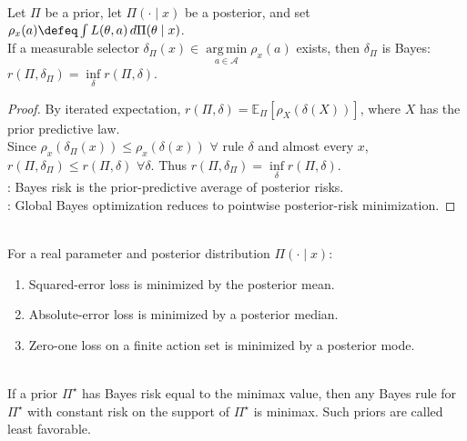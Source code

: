 \begin{proposition} \label{prop:posterior-risk-bayes-rule} \\
Let $\Pi$ be a prior, let $\Pi(\cdot\mid x)$ be a posterior, and set $\rho_x(a)\defeq\int L(\theta,a)\,d\Pi(\theta\mid x)$.\\
If a measurable selector $\delta_\Pi(x)\in\operatorname*{arg\,min}\limits_{a\in\mathcal{A}}\rho_x(a)$ exists, then $\delta_\Pi$ is Bayes: $r(\Pi,\delta_\Pi)=\inf\limits_\delta r(\Pi,\delta)$.
\begin{proof} By iterated expectation, $r(\Pi,\delta)=\mathbb{E}_{\Pi}[\rho_X(\delta(X))]$, where $X$ has the prior predictive law.\\
Since $\rho_x(\delta_\Pi(x))\leq\rho_x(\delta(x))$ $\forall$ rule $\delta$ and almost every $x$, $r(\Pi,\delta_\Pi)\leq r(\Pi,\delta)$ $\forall \delta$.
Thus $r(\Pi,\delta_\Pi)=\inf\limits_\delta r(\Pi,\delta)$.\\
: Bayes risk is the prior-predictive average of posterior risks.\\
: Global Bayes optimization reduces to pointwise posterior-risk minimization.
\end{proof}
\end{proposition}

\begin{example} \label{ex:posterior-mean-median-mode-loss} \\
For a real parameter and posterior distribution $\Pi(\cdot\mid x)$:
\begin{enumerate}[label=(\roman*)]
\setlength{\itemsep}{0pt}
\item Squared-error loss is minimized by the posterior mean.
\item Absolute-error loss is minimized by a posterior median.
\item Zero-one loss on a finite action set is minimized by a posterior mode.
\end{enumerate}
\end{example}

\begin{remark} \label{rem:minimax-bayes-least-favorable} \\
If a prior $\Pi^\star$ has Bayes risk equal to the minimax value, then any Bayes rule for $\Pi^\star$ with constant risk on the support of $\Pi^\star$ is minimax.  Such priors are called least favorable.
\end{remark}
